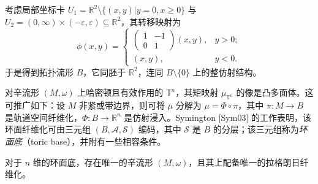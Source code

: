 
考虑局部坐标卡 $U_1=\mathbb{R}^2\setminus\{(x,y)\vert y=0, x\geq 0\}$ 与 $U_2=(0,\infty)\times (-\varepsilon,\varepsilon)\subseteq\mathbb{R}^2$，其转移映射为
\[
\phi (x,y)=\left\lbrace\begin{array}{ll} \begin{pmatrix}1&-1\\0&1\end{pmatrix}(x,y),&y>0;\\ (x,y),&y<0. \end{array}\right.
\]
于是得到拓扑流形 $B$，它同胚于 $\mathbb{R}^2$，连同 $B\setminus\{0\}$ 上的整仿射结构。


对辛流形 $(M,\omega)$ 上哈密顿且有效作用的 $\mathbb{T}^n$，其矩映射 $\mu_{\mathbb{T}^n}$ 的像是凸多面体。这可推广如下：设 $M$ 非紧或带边界，则可将 $\mu$ 分解为 $\mu=\Phi\circ\pi$，其中 $\pi\colon M\to B$ 是轨道空间纤维化，$\Phi\colon B\to\mathbb{R}^n$ 是仿射浸入。Symington [Sym03] 的工作表明，该环面纤维化可由三元组 $(B,\mathcal{A},\mathcal{S})$ 编码，其中 $\mathcal{S}$ 是 $B$ 的分层；该三元组称为\emph{环面底}（toric base），并附有一些相容条件。


\begin{theorem*}
对于 $n$ 维的环面底，存在唯一的辛流形 $(M,\omega)$，且其上配备唯一的拉格朗日纤维化。
\end{theorem*}

